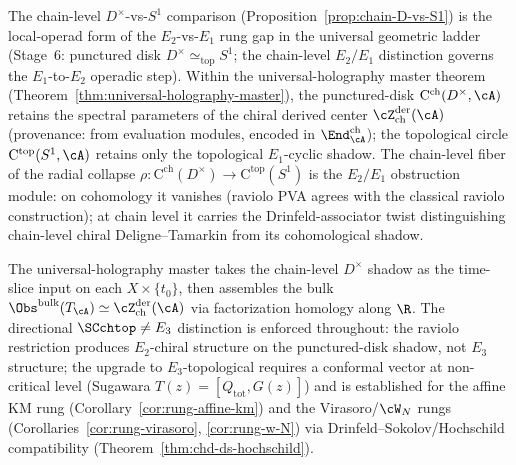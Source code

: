 \begin{remark}
\label{rem:raviolo-restriction-holography-anchor}%
%
The chain-level $D^\times$-vs-$S^1$ comparison
(Proposition~\ref{prop:chain-D-vs-S1}) is the local-operad
form of the $E_2$-vs-$E_1$ rung gap in the universal
geometric ladder (Stage~6: punctured disk
$D^\times \simeq_{\mathrm{top}} S^1$; the chain-level $E_2/E_1$
distinction governs the $E_1$-to-$E_2$ operadic step).
Within the universal-holography master theorem
(Theorem~\ref{thm:universal-holography-master}), the punctured-disk
$\mathrm{C}^{\mathrm{ch}}(D^\times, \cA)$ retains the spectral
parameters of the chiral derived center
$\cZ^{\mathrm{der}}_{\mathrm{ch}}(\cA)$ (provenance: from evaluation
modules, encoded in $\End^{\mathrm{ch}}_\cA$); the topological circle
$\mathrm{C}^{\mathrm{top}}(S^1, \cA)$ retains only the topological
$E_1$-cyclic shadow. The chain-level fiber of the radial collapse
$\rho\colon \mathrm{C}^{\mathrm{ch}}(D^\times) \to \mathrm{C}^{\mathrm{top}}(S^1)$
is the $E_2/E_1$ obstruction module: on cohomology it vanishes (raviolo
PVA agrees with the classical raviolo construction); at chain level it
carries the Drinfeld-associator twist distinguishing chain-level
chiral Deligne--Tamarkin from its cohomological shadow.

The universal-holography master takes the chain-level $D^\times$
shadow as the time-slice input on each $X \times \{t_0\}$, then
assembles the bulk $\Obs^{\mathrm{bulk}}(T_\cA) \simeq
\cZ^{\mathrm{der}}_{\mathrm{ch}}(\cA)$ via factorization homology
along $\R$. The directional $\SCchtop \neq E_3$ distinction is
enforced throughout: the raviolo restriction produces $E_2$-chiral
structure on the punctured-disk shadow, not $E_3$ structure; the
upgrade to $E_3$-topological requires a conformal vector at
non-critical level (Sugawara $T(z) = [Q_{\mathrm{tot}}, G(z)]$) and
is established for the affine KM rung
(Corollary~\ref{cor:rung-affine-km}) and the Virasoro/$\cW_N$ rungs
(Corollaries~\ref{cor:rung-virasoro}, \ref{cor:rung-w-N}) via
Drinfeld--Sokolov/Hochschild compatibility
(Theorem~\ref{thm:chd-ds-hochschild}).
\end{remark}
